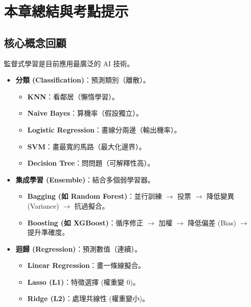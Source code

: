\documentclass[
  letterpaper,
  DIV=11,
  numbers=noendperiod]{scrreprt}
\providecommand{\tightlist}{%
  \setlength{\itemsep}{0pt}\setlength{\parskip}{0pt}}
\begin{document}
\chapter{本章總結與考點提示}\label{sec-chapter5-summary}

\section{核心概念回顧}\label{ux6838ux5fc3ux6982ux5ff5ux56deux9867-4}

監督式學習是目前應用最廣泛的 AI 技術。

\begin{itemize}
\tightlist
\item
  \textbf{分類 (Classification)}：預測類別（離散）。

  \begin{itemize}
  \tightlist
  \item
    \textbf{KNN}：看鄰居（懶惰學習）。
  \item
    \textbf{Naive Bayes}：算機率（假設獨立）。
  \item
    \textbf{Logistic Regression}：畫線分兩邊（輸出機率）。
  \item
    \textbf{SVM}：畫最寬的馬路（最大化邊界）。
  \item
    \textbf{Decision Tree}：問問題（可解釋性高）。
  \end{itemize}
\item
  \textbf{集成學習 (Ensemble)}：結合多個弱學習器。

  \begin{itemize}
  \tightlist
  \item
    \textbf{Bagging (如 Random Forest)}：並行訓練 \(\rightarrow\) 投票
    \(\rightarrow\) 降低變異 (Variance) \(\rightarrow\) 抗過擬合。
  \item
    \textbf{Boosting (如 XGBoost)}：循序修正 \(\rightarrow\) 加權
    \(\rightarrow\) 降低偏差 (Bias) \(\rightarrow\) 提升準確度。
  \end{itemize}
\item
  \textbf{迴歸 (Regression)}：預測數值（連續）。

  \begin{itemize}
  \tightlist
  \item
    \textbf{Linear Regression}：畫一條線擬合。
  \item
    \textbf{Lasso (L1)}：特徵選擇 (權重變 0)。
  \item
    \textbf{Ridge (L2)}：處理共線性 (權重變小)。
  \end{itemize}
\end{itemize}
\end{document}
